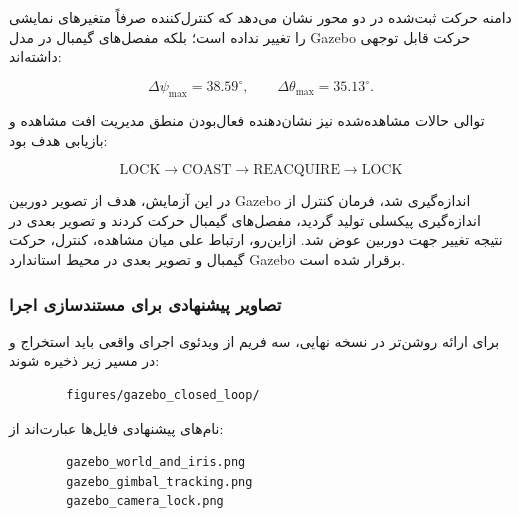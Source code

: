 \documentclass[12pt,a4paper]{article}
\begin{document}
دامنه حرکت ثبت‌شده در دو محور نشان می‌دهد که کنترل‌کننده صرفاً
متغیرهای نمایشی را تغییر نداده است؛ بلکه مفصل‌های گیمبال در مدل
Gazebo حرکت قابل توجهی داشته‌اند:

\begin{equation}
	\Delta\psi_{\max}
	=
	38.59^\circ,
	\qquad
	\Delta\theta_{\max}
	=
	35.13^\circ.
	\label{eq:gazebo_gimbal_motion}
\end{equation}

توالی حالات مشاهده‌شده نیز نشان‌دهنده فعال‌بودن منطق مدیریت افت
مشاهده و بازیابی هدف بود:




\begin{equation}
	\boxed{
		\mathrm{LOCK}
		\longrightarrow
		\mathrm{COAST}
		\longrightarrow
		\mathrm{REACQUIRE}
		\longrightarrow
		\mathrm{LOCK}
	}
	\label{eq:gazebo_state_machine_sequence}
\end{equation}

\begin{keybox}
	در این آزمایش، هدف از تصویر دوربین Gazebo اندازه‌گیری شد، فرمان
	کنترل از اندازه‌گیری پیکسلی تولید گردید، مفصل‌های گیمبال حرکت کردند
	و تصویر بعدی در نتیجه تغییر جهت دوربین عوض شد. ازاین‌رو، ارتباط
	علی میان مشاهده، کنترل، حرکت گیمبال و تصویر بعدی در محیط استاندارد
	Gazebo برقرار شده است.
\end{keybox}

\subsubsection{تصاویر پیشنهادی برای مستندسازی اجرا}
\label{subsubsec:gazebo_execution_figures}

برای ارائه روشن‌تر در نسخه نهایی، سه فریم از ویدئوی اجرای واقعی
باید استخراج و در مسیر زیر ذخیره شوند:

\begin{latin}
	\begin{verbatim}
		figures/gazebo_closed_loop/
	\end{verbatim}
\end{latin}

نام‌های پیشنهادی فایل‌ها عبارت‌اند از:

\begin{latin}
	\begin{verbatim}
		gazebo_world_and_iris.png
		gazebo_gimbal_tracking.png
		gazebo_camera_lock.png
	\end{verbatim}
\end{latin}
\end{document}
